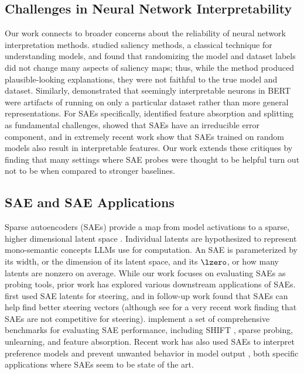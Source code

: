 \subsection{Challenges in Neural Network Interpretability}
Our work connects to broader concerns about the reliability of neural network interpretation methods. \citet{adebayo2018sanity} studied saliency methods, a classical technique for understanding models, and found that randomizing the model and dataset labels did not change many aspects of saliency maps; thus, while the method produced plausible-looking explanations, they were not faithful to the true model and dataset. Similarly, \cite{bolukbasi2021interpretability} demonstrated that seemingly interpretable neurons in BERT were artifacts of running on only a particular dataset rather than more general representations. For SAEs specifically, \cite{chanin2024absorption} identified feature absorption and splitting as fundamental challenges, \citet{gao2024scalingevaluatingsparseautoencoders} showed that SAEs have an irreducible error component, and in extremely recent work \citet{heap2025sparseautoencodersinterpretrandomly} show that SAEs trained on random models also result in interpretable features. Our work extends these critiques by finding that many settings where SAE probes were thought to be helpful turn out not to be when compared to stronger baselines.

\subsection{SAE and SAE Applications}
Sparse autoencoders (SAEs) provide a map from model activations to a sparse, higher dimensional latent space \cite{dictionary_monosemanticity_anthropic, other_sae_paper}. Individual latents are hypothesized to represent mono-semantic concepts LLMs use for computation. An SAE is parameterized by its $\mathrm{width}$, or the dimension of its latent space, and its $\lzero$, or how many latents are nonzero on average. While our work focuses on evaluating SAEs as probing tools, prior work has explored various downstream applications of SAEs. \citet{templeton2024scaling} first used SAE latents for steering, and in follow-up work \citet{chalnev2024improving} found that SAEs can help find better steering vectors (although see \cite{wu2025axbenchsteeringllmssimple} for a very recent work finding that SAEs are not competitive for steering). \citet{neuronpediaSAEBenchComprehensive} implement a set of comprehensive benchmarks for evaluating SAE performance, including SHIFT \cite{marks2024sparse}, sparse probing, unlearning, and feature absorption. Recent work has also used SAEs to interpret preference models \cite{smith2024sparse_autoencoders} and prevent unwanted behavior in model output \cite{karvonen2024sieve}, both specific applications where SAEs seem to be state of the art.